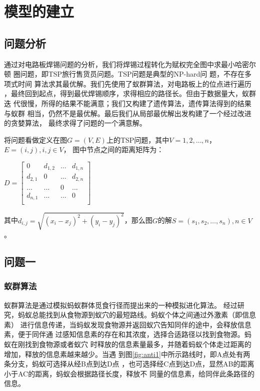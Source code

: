 \documentclass[fontset=windows,a4paper,12pt]{ctexart}
\begin{document}
  \section{模型的建立}
    \subsection{问题分析}
      通过对电路板焊锡问题的分析，我们将焊锡过程转化为赋权完全图中求最小哈密尔顿
      圈问题，即TSP旅行售货员问题。TSP问题是典型的NP-hard问
      题\cite{gutin2006traveling}，不存在多项式时间
      算法求其最优解。我们先使用了蚁群算法，对电路板上的位点进行遍历
      ，最终回到起点，得到最优焊锡顺序，求得相应的路径长。但由于数据量大，蚁群迭
      代很慢，所得的结果不能满意；我们又构建了遗传算法，遗传算法得到的结果与蚁群
      相当，仍然不是最优解。最后我们从局部最优解出发构建了一个经过改进的贪婪算法，
      最终求得了问题的一个满意解。
      
      将问题看做定义在图$G=(V,E)$上的TSP问题，其中$V={1,2,\dots,n}$，$E=(i,j),i,j\in V$，
      图中节点之间的距离矩阵为：
      \begin{center}
      	      \begin{math}
      	      D=\left[
      	      \begin{array}{cccc}
      	      0 & d_{1,2} & \dots & d_{1,n}\\
      	      d_{2,1} & 0 & \dots & d_{2,n}\\
      	      \dots & \dots & 0 & \dots \\
      	      d_{n,1} & \dots & \dots & 0 \\
      	      \end{array}
      	      \right]
      	      \end{math}
      \end{center}
	  其中$d_{i,j}=\sqrt{(x_i-x_j)^2+(y_i-y_j)^2}$，那么图$G$的解$S=(s_1,s_2,\dots,s_n),n \in V$。
    \subsection{问题一}
	   \subsubsection{蚁群算法}
		   蚁群算法是通过模拟蚂蚁群体觅食行径而提出来的一种模拟进化算法\cite{士勇2004蚁群算法及其应用}。
		   经过研究，蚂蚁总能找到从食物源到蚁穴的最短路线。蚂蚁个体之间通过外激素（即信息素）
		   进行信息传递，当蚂蚁发现食物源并返回蚁穴告知同伴的途中，会释放信息素，便于同伴通
		   过感知信息素的存在和其浓度，选择合适路径以找到食物源。蚂蚁在刚找到食物源或者蚁穴
		   时释放的信息素量最多，并随着蚂蚁个体走过距离的增加，释放的信息素越来越少。当遇
		   到图\ref{fig:anti1}中所示路线时，即A点处有两条分支，蚂蚁可选择从经B点到达D点
		   ，也可选择经C点到达D点，显然AB的距离小于AC的距离，蚂蚁会根据路径长度，释放不
		   同量的信息素，给同伴此条路径的信息\cite{马良2001蚂蚁算法在组合优化中的应用}。
		   
\end{document}
